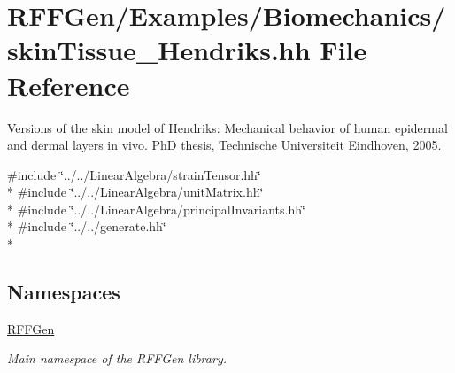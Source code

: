 \hypertarget{skinTissue__Hendriks_8hh}{\section{R\-F\-F\-Gen/\-Examples/\-Biomechanics/skin\-Tissue\-\_\-\-Hendriks.hh File Reference}
\label{skinTissue__Hendriks_8hh}
}


Versions of the skin model of Hendriks\-: Mechanical behavior of human epidermal and dermal layers in vivo. Ph\-D thesis, Technische Universiteit Eindhoven, 2005.  


{\ttfamily \#include \char`\"{}../../\-Linear\-Algebra/strain\-Tensor.\-hh\char`\"{}}\\*
{\ttfamily \#include \char`\"{}../../\-Linear\-Algebra/unit\-Matrix.\-hh\char`\"{}}\\*
{\ttfamily \#include \char`\"{}../../\-Linear\-Algebra/principal\-Invariants.\-hh\char`\"{}}\\*
{\ttfamily \#include \char`\"{}../../generate.\-hh\char`\"{}}\\*
\subsection*{Namespaces}
\begin{DoxyCompactItemize}
\item 
\hyperlink{namespaceRFFGen}{R\-F\-F\-Gen}
\begin{DoxyCompactList}\small\item\em Main namespace of the R\-F\-F\-Gen library. \end{DoxyCompactList}\end{DoxyCompactItemize}
